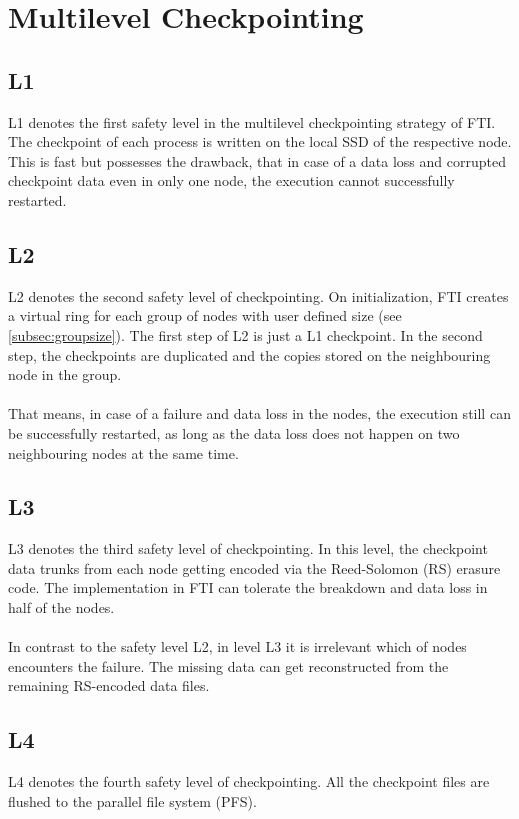 \documentclass{refrep}
\begin{document}
\chapter{Multilevel Checkpointing}\label{ch:multilevelcheckpointing}
\section{L1}\label{sec:l1}
L1 denotes the first safety level in the multilevel checkpointing strategy of FTI. The checkpoint of each process is written on the local SSD of the respective node. This is fast but possesses the drawback, that in case of a data loss and corrupted checkpoint data even in only one node, the execution cannot successfully restarted.
\section{L2}\label{sec:l2}
L2 denotes the second safety level of checkpointing. On initialization, FTI creates a virtual ring for each group of nodes with user defined size (see \ref{subsec:groupsize}). The first step of L2 is just a L1 checkpoint. In the second step, the checkpoints are duplicated and the copies stored on the neighbouring node in the group.
\\{}\\
That means, in case of a failure and data loss in the nodes, the execution still can be successfully restarted, as long as the data loss does not happen on two neighbouring nodes at the same time.
\section{L3}\label{sec:l3}
L3 denotes the third safety level of checkpointing. In this level, the checkpoint data trunks from each node getting encoded via the Reed-Solomon (RS) erasure code. The implementation in FTI can tolerate the breakdown and data loss in half of the nodes.
\\{}\\
In contrast to the safety level L2, in level L3 it is irrelevant which of nodes encounters the failure. The missing data can get reconstructed from the remaining RS-encoded data files.
\section{L4}\label{sec:l4}
L4 denotes the fourth safety level of checkpointing. All the checkpoint files are flushed to the parallel file system (PFS).
\end{document}

